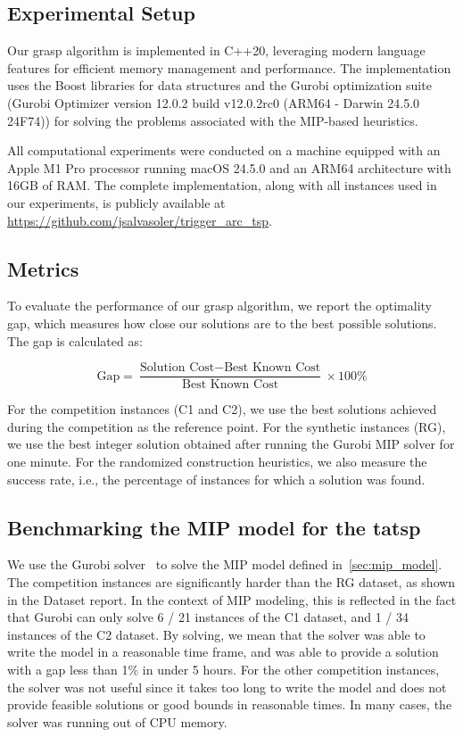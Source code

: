 \subsection{Experimental Setup}

Our \gls{grasp} algorithm is implemented in C++20, leveraging modern language features for efficient memory management and performance.
The implementation uses the Boost libraries for data structures and the Gurobi optimization suite (Gurobi Optimizer version 12.0.2 build v12.0.2rc0 (ARM64 - Darwin 24.5.0 24F74)) for solving the problems associated with the MIP-based heuristics.

All computational experiments were conducted on a machine equipped with an Apple M1 Pro processor running macOS 24.5.0 and an ARM64 architecture with 16GB of RAM.
The complete implementation, along with all instances used in our experiments, is publicly available at \url{https://github.com/jsalvasoler/trigger_arc_tsp}.

\subsection{Metrics}

To evaluate the performance of our \gls{grasp} algorithm, we report the optimality gap, which measures how close our solutions are to the best possible solutions. The gap is calculated as:

\begin{equation}
\text{Gap} = \frac{\text{Solution Cost} - \text{Best Known Cost}}{\text{Best Known Cost}} \times 100\%
\end{equation}

For the competition instances (C1 and C2), we use the best solutions achieved during the competition as the reference point.
For the synthetic instances (RG), we use the best integer solution obtained after running the Gurobi MIP solver for one minute.
For the randomized construction heuristics, we also measure the success rate, i.e., the percentage of instances for which a solution was found.

\subsection{Benchmarking the MIP model for the \gls{tatsp}}

We use the Gurobi solver~\cite{gurobi} to solve the MIP model defined in~\ref{sec:mip_model}.
The competition instances are significantly harder than the RG dataset, as shown in the Dataset report. In the context of MIP modeling, this is reflected in the fact
that Gurobi can only solve 6 / 21 instances of the C1 dataset, and 1 / 34 instances of the C2 dataset.
By solving, we mean that the solver was able to write the model in a reasonable time frame, and was able to provide a solution with a gap less than 1\% in under 5 hours.
For the other competition instances, the solver was not useful since it takes too long to write the model and does not provide feasible solutions or good bounds in reasonable times.
In many cases, the solver was running out of CPU memory.

